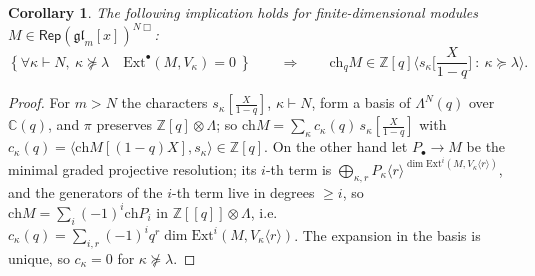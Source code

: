 \documentclass[11pt]{amsart}
\numberwithin{equation}{section}
\newtheorem{corollary}[equation]{Corollary}
\theoremstyle{definition}
\newcommand{\gl}{\mathfrak{gl}}
\newcommand{\ch}{\mathrm{ch}}
\newcommand{\Ext}{\mathrm{Ext}}
\newcommand{\Rep}{\mathsf{Rep}}
\newcommand{\Lam}{\Lambda}
\begin{document}
	\begin{corollary}\label{cor:Ext-char}
		The following implication holds for finite-dimensional modules $M\in \Rep(\gl_m[x])^{N\Box}$:
		\[
		\left\{\forall \kappa\vdash N,\ \kappa\not\succeq\lambda \quad\Ext^\bullet(M,V_\kappa)=0 \ \right\} \qquad \Rightarrow \qquad
		\ch_qM\in\mathbb Z[q]\Big\langle s_\kappa\Big[\frac X{1-q}\Big]\ :\ \kappa\succeq\lambda\Big\rangle .
		\]
	\end{corollary}
	\begin{proof}
		For $m>N$ the characters $s_\kappa[\frac X{1-q}]$, $\kappa\vdash N$, form a basis of $\Lam^N(q)$ over $\mathbb{C}(q)$, and $\pi$ preserves $\mathbb Z[q]\otimes\Lam$; so $\ch M=\sum_\kappa c_\kappa(q)\,s_\kappa[\frac X{1-q}]$ with $c_\kappa(q)=\langle\ch M[(1-q)X],s_\kappa\rangle\in\mathbb Z[q]$. On the other hand let $P_\bullet\to M$ be the minimal graded projective resolution; its $i$-th term is $\bigoplus_{\kappa,r}P_\kappa\langle r\rangle^{\dim\Ext^i(M,V_\kappa\langle r\rangle)}$, and the generators of the $i$-th term live in degrees $\ge i$, so $\ch M=\sum_i(-1)^i\ch P_i$ in $\mathbb Z[[q]]\otimes\Lam$, i.e.\ $c_\kappa(q)=\sum_{i,r}(-1)^iq^r\dim\Ext^i(M,V_\kappa\langle r\rangle)$. The expansion in the basis is unique, so $c_\kappa=0$ for $\kappa\not\succeq\lambda$.
	\end{proof}
	
\end{document}
